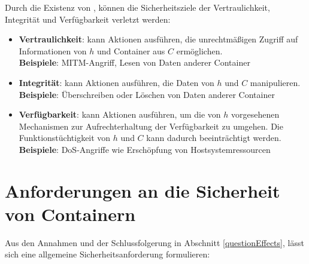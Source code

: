 \documentclass[../main.tex]{subfiles}
\begin{document}


    Durch die Existenz von \cbroken{}, können die Sicherheitsziele der Vertraulichkeit, Integrität und Verfügbarkeit verletzt werden:

    \begin{itemize}
      \item \textbf{Vertraulichkeit}: \cbroken{} kann Aktionen ausführen, die unrechtmäßigen Zugriff auf Informationen von \(h\) und Container aus \(C\) ermöglichen. \\
      \textbf{Beispiele}: \acrshort{MITM}-Angriff, Lesen von Daten anderer Container
      \item \textbf{Integrität}: \cbroken{} kann Aktionen ausführen, die Daten von \(h\) und \(C\) manipulieren. \\
      \textbf{Beispiele}: Überschreiben oder Löschen von Daten anderer Container
      \item \textbf{Verfügbarkeit}: \cbroken{} kann Aktionen ausführen, um die von \(h\) vorgesehenen Mechanismen zur Aufrechterhaltung der Verfügbarkeit zu umgehen. Die Funktionstüchtigkeit von \(h\) und \(C\) kann dadurch beeinträchtigt werden. \\
      \textbf{Beispiele}: \acrshort{DoS}-Angriffe wie Erschöpfung von Hostsystemressourcen
    \end{itemize}


  \section{Anforderungen an die Sicherheit von Containern}
    Aus den Annahmen und der Schlussfolgerung in Abschnitt \ref{questionEffects}, lässt sich eine allgemeine Sicherheitsanforderung formulieren:
\end{document}
